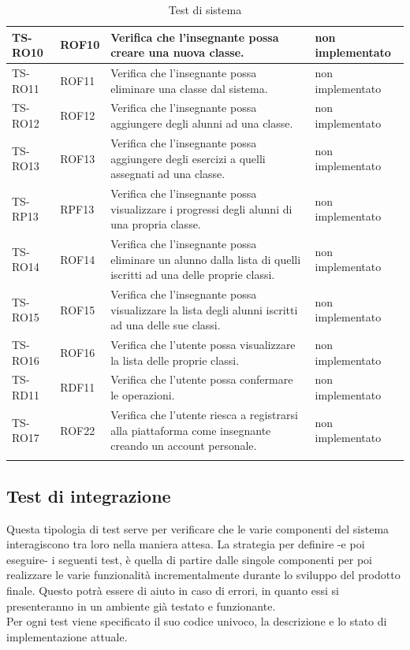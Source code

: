 \begin{longtable}{|>{\centering\arraybackslash}m{1.6cm}|>{\centering\arraybackslash}m{1.7cm}|m{6.41cm}|>{\centering\arraybackslash}m{3.1cm}|}
		\rowcolor{white}
		TS-RO10	
		& ROF10 
		& Verifica che l'insegnante possa creare una nuova classe. 
		& non implementato\\ \hline
		\rowcolor{LightGray}
		TS-RO11	
		& ROF11 
		& Verifica che l'insegnante possa eliminare una classe dal sistema. 
		& non implementato\\ \hline
		\rowcolor{white}
		TS-RO12
		& ROF12 
		& Verifica che l'insegnante possa aggiungere degli alunni ad una classe. 
		& non implementato\\ \hline
		\rowcolor{LightGray}
		TS-RO13
		& ROF13 
		& Verifica che l'insegnante possa aggiungere degli esercizi a quelli assegnati ad una classe. 
		& non implementato\\ \hline
		\rowcolor{white}
		TS-RP13
		& RPF13 
		& Verifica che l'insegnante possa visualizzare i progressi degli alunni di una propria classe.
		& non implementato\\ \hline
		\rowcolor{LightGray}
		TS-RO14
		& ROF14 
		& Verifica che l'insegnante possa eliminare un alunno dalla lista di quelli iscritti ad una delle proprie classi. 
		& non implementato\\ \hline
		\rowcolor{white}
		TS-RO15	
		& ROF15 
		& Verifica che l'insegnante possa visualizzare la lista degli alunni iscritti ad una delle sue classi. 
		& non implementato\\ \hline
		\rowcolor{LightGray}
		TS-RO16
		& ROF16 
		& Verifica che l'utente possa visualizzare la lista delle proprie classi. 
		& non implementato\\ \hline
		\rowcolor{white}
		TS-RD11	
		& RDF11 
		& Verifica che l'utente possa confermare le operazioni.
		& non implementato\\ \hline
		\rowcolor{LightGray}
		TS-RO17
		& ROF22 
		& Verifica che l'utente riesca a registrarsi alla piattaforma come insegnante creando un account personale. 
		& non implementato\\ \hline
		
		\caption{Test di sistema}
\end{longtable}

\subsection{Test di integrazione}
Questa tipologia di test serve per verificare che le varie componenti del sistema interagiscono tra loro nella maniera attesa. La strategia per definire -e poi eseguire- i seguenti test, è quella di partire dalle singole componenti per poi realizzare le varie funzionalità incrementalmente durante lo sviluppo del prodotto finale. Questo potrà essere di aiuto in caso di errori, in quanto essi si presenteranno in un ambiente già testato e funzionante. \\
Per ogni test viene specificato il suo codice univoco, la descrizione e lo stato di implementazione attuale.

